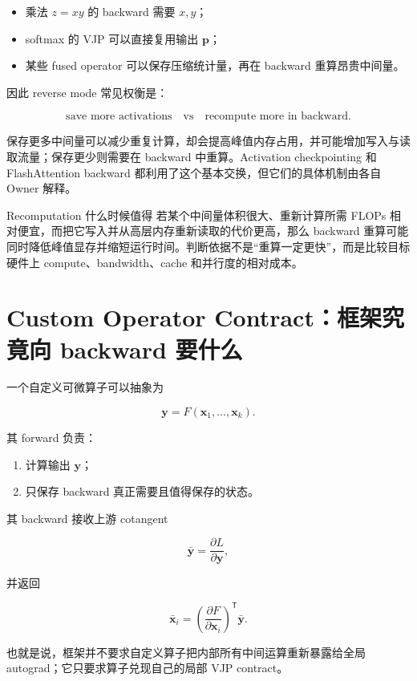 \documentclass[profile=standard,twoside=false]{ipara-handbook}
\begin{document}
\begin{itemize}
  \item 乘法 $z=xy$ 的 backward 需要 $x,y$；
  \item softmax 的 VJP 可以直接复用输出 $\boldsymbol{p}$；
  \item 某些 fused operator 可以保存压缩统计量，再在 backward 重算昂贵中间量。
\end{itemize}

因此 reverse mode 常见权衡是：

$$
\boxed{
\text{save more activations}
\quad\text{vs}\quad
\text{recompute more in backward}
}.
$$

保存更多中间量可以减少重复计算，却会提高峰值内存占用，并可能增加写入与读取流量；保存更少则需要在 backward 中重算。Activation checkpointing 和 FlashAttention backward 都利用了这个基本交换，但它们的具体机制由各自 Owner 解释。

\begin{mechanism}{Recomputation 什么时候值得}
若某个中间量体积很大、重新计算所需 FLOPs 相对便宜，而把它写入并从高层内存重新读取的代价更高，那么 backward 重算可能同时降低峰值显存并缩短运行时间。判断依据不是“重算一定更快”，而是比较目标硬件上 compute、bandwidth、cache 和并行度的相对成本。
\end{mechanism}

\section{Custom Operator Contract：框架究竟向 backward 要什么}

一个自定义可微算子可以抽象为

$$
\boldsymbol{y}=F(\boldsymbol{x}_1,\ldots,\boldsymbol{x}_k).
$$

其 forward 负责：

\begin{enumerate}
  \item 计算输出 $\boldsymbol{y}$；
  \item 只保存 backward 真正需要且值得保存的状态。
\end{enumerate}

其 backward 接收上游 cotangent

$$
\bar{\boldsymbol{y}}
=\frac{\partial L}{\partial\boldsymbol{y}},
$$

并返回

$$
\bar{\boldsymbol{x}}_i
=\left(\frac{\partial F}{\partial\boldsymbol{x}_i}\right)^{\mathsf T}
\bar{\boldsymbol{y}}.
$$

也就是说，框架并不要求自定义算子把内部所有中间运算重新暴露给全局 autograd；它只要求算子兑现自己的局部 VJP contract。
\end{document}

